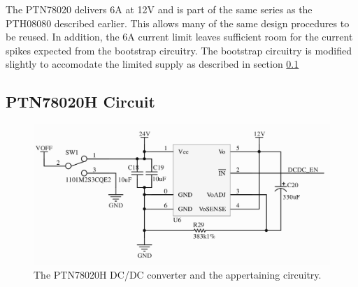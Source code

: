 The PTN78020 delivers 6A at 12V and is part of the same series as the PTH08080 described earlier.
This allows many of the same design procedures to be reused.
In addition, the 6A current limit leaves sufficient room for the current spikes expected from the bootstrap circuitry.
The bootstrap circuitry is modified slightly to accomodate the limited supply as described in section \ref{}




\subsection{PTN78020H Circuit}

\begin{figure}
	\centering
	\includegraphics[width=\linewidth]{graphics/dcdc12v}
	\caption{The PTN78020H DC/DC converter and the appertaining circuitry.}
	\label{fig:dcdc12v}
\end{figure}

